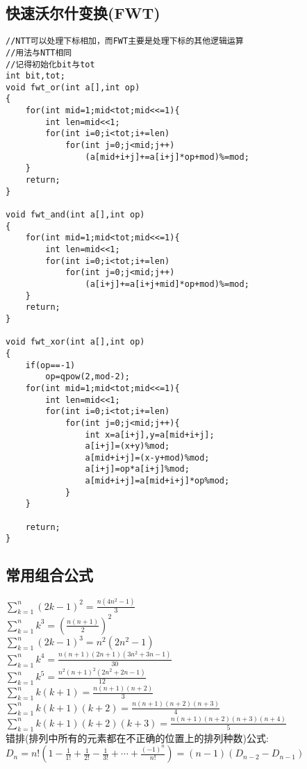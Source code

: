 \documentclass[twocolumn,a4]{article}
\begin{document}
\subsection{快速沃尔什变换(FWT)}
\begin{lstlisting}
//NTT可以处理下标相加，而FWT主要是处理下标的其他逻辑运算
//用法与NTT相同
//记得初始化bit与tot
int bit,tot;
void fwt_or(int a[],int op)
{
    for(int mid=1;mid<tot;mid<<=1){
        int len=mid<<1;
        for(int i=0;i<tot;i+=len)
            for(int j=0;j<mid;j++)
                (a[mid+i+j]+=a[i+j]*op+mod)%=mod;
    }
    return;
}

void fwt_and(int a[],int op)
{
    for(int mid=1;mid<tot;mid<<=1){
        int len=mid<<1;
        for(int i=0;i<tot;i+=len)
            for(int j=0;j<mid;j++)
                (a[i+j]+=a[i+j+mid]*op+mod)%=mod;
    }
    return;
}

void fwt_xor(int a[],int op)
{
    if(op==-1)
        op=qpow(2,mod-2);
    for(int mid=1;mid<tot;mid<<=1){
        int len=mid<<1;
        for(int i=0;i<tot;i+=len)
            for(int j=0;j<mid;j++){
                int x=a[i+j],y=a[mid+i+j];
                a[i+j]=(x+y)%mod;
                a[mid+i+j]=(x-y+mod)%mod;
                a[i+j]=op*a[i+j]%mod;
                a[mid+i+j]=a[mid+i+j]*op%mod;
            }
    }

    return;
}
\end{lstlisting}

\subsection{常用组合公式}
$\displaystyle \sum_{k=1}^{n}(2k-1)^{2}=\frac{n(4n^{2}-1)}{3}$\\
$\displaystyle \sum_{k=1}^{n}k^{3}=\left(\frac{n(n+1)}{2}\right)^{2}$\\
$\displaystyle \sum_{k=1}^{n}(2k-1)^{3}=n^{2}(2n^{2}-1)$\\
$\displaystyle \sum_{k=1}^{n}k^{4}=\frac{n(n+1)(2n+1)(3n^{2}+3n-1)}{30}$\\
$\displaystyle \sum_{k=1}^{n}k^{5}=\frac{n^{2}(n+1)^{2}(2n^{2}+2n-1)}{12}$\\
$\displaystyle \sum_{k=1}^{n}k(k+1)=\frac{n(n+1)(n+2)}{3}$\\
$\displaystyle \sum_{k=1}^{n}k(k+1)(k+2)=\frac{n(n+1)(n+2)(n+3)}{4}$\\
$\displaystyle \sum_{k=1}^{n}k(k+1)(k+2)(k+3)=\frac{n(n+1)(n+2)(n+3)(n+4)}{5}$\\
错排(排列中所有的元素都在不正确的位置上的排列种数)公式:\\
$D_{n}=n!\left(1-\frac{1}{1!}+\frac{1}{2!}-\frac{1}{3!}+\cdots+\frac{(-1)^{n}}{n!}\right)=(n-1)(D_{n-2}-D_{n-1})$\\
\end{document}
